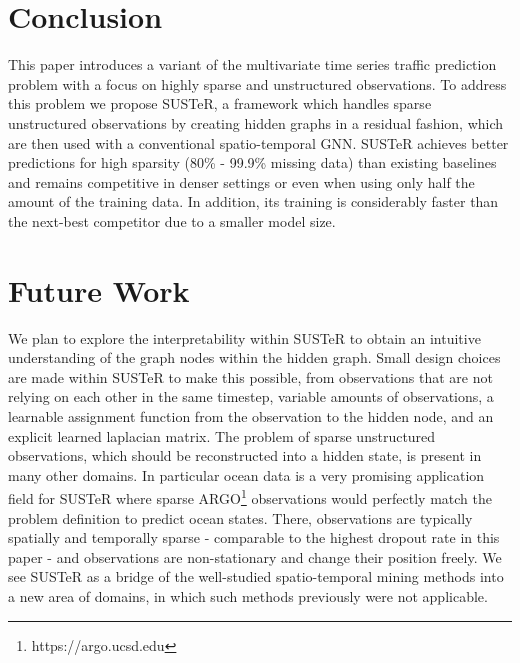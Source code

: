 
\section{Conclusion}

This paper introduces a variant of the multivariate time series traffic prediction problem with a focus on highly sparse and unstructured observations.
To address this problem we propose SUSTeR, a framework which handles sparse unstructured observations by creating hidden graphs in a residual fashion, which are then used with a conventional spatio-temporal GNN.
SUSTeR achieves better predictions for high sparsity (80\% - 99.9\% missing data) than existing baselines and remains competitive in denser settings or even when using only half the amount of the training data.
In addition, its training is considerably faster than the next-best competitor due to a smaller model size.



\section{Future Work}

We plan to explore the interpretability within SUSTeR to obtain an intuitive understanding of the graph nodes within the hidden graph.
Small design choices are made within SUSTeR to make this possible, from observations that are not relying on each other in the same timestep, variable amounts of observations, a learnable assignment function from the observation to the hidden node, and an explicit learned laplacian matrix. 
The problem of sparse unstructured observations, which should be reconstructed into a hidden state, is present in many other domains.
In particular ocean data is a very promising application field for SUSTeR where sparse ARGO\footnote{https://argo.ucsd.edu} observations would perfectly match the problem definition to predict ocean states. 
There, observations are typically spatially and temporally sparse - comparable to the highest dropout rate in this paper - and observations are non-stationary and change their position freely.
We see SUSTeR as a bridge of the well-studied spatio-temporal mining methods into a new area of domains, in which such methods previously were not applicable.
